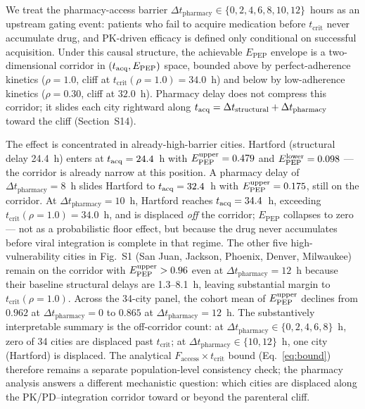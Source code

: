 \documentclass[10pt,letterpaper]{article}
\theoremstyle{definition}
\theoremstyle{remark}
\newcommand{\Epep}{E_{\text{PEP}}}
\newcommand{\Faccess}{F_{\text{access}}}
\newcommand{\tcrit}{t_{\text{crit}}}
\begin{document}
We treat the pharmacy-access barrier $\Delta t_{\text{pharmacy}} \in \{0, 2, 4, 6, 8, 10, 12\}$~hours as an upstream gating event: patients who fail to acquire medication before $\tcrit$ never accumulate drug, and PK-driven efficacy is defined only conditional on successful acquisition. Under this causal structure, the achievable $\Epep$ envelope is a two-dimensional corridor in $(t_{\rm acq}, \Epep)$ space, bounded above by perfect-adherence kinetics ($\rho = 1.0$, cliff at $\tcrit(\rho{=}1.0) = 34.0$~h) and below by low-adherence kinetics ($\rho = 0.30$, cliff at $32.0$~h). Pharmacy delay does not compress this corridor; it slides each city rightward along $t_{\rm acq} = \Delta t_{\text{structural}} + \Delta t_{\text{pharmacy}}$ toward the cliff (Section~S14).

The effect is concentrated in already-high-barrier cities. Hartford (structural delay 24.4~h) enters at $t_{\rm acq} = 24.4$~h with $\Epep^{\rm upper} = 0.479$ and $\Epep^{\rm lower} = 0.098$ --- the corridor is already narrow at this position. A pharmacy delay of $\Delta t_{\text{pharmacy}} = 8$~h slides Hartford to $t_{\rm acq} = 32.4$~h with $\Epep^{\rm upper} = 0.175$, still on the corridor. At $\Delta t_{\text{pharmacy}} = 10$~h, Hartford reaches $t_{\rm acq} = 34.4$~h, exceeding $\tcrit(\rho{=}1.0) = 34.0$~h, and is displaced \emph{off} the corridor; $\Epep$ collapses to zero --- not as a probabilistic floor effect, but because the drug never accumulates before viral integration is complete in that regime. The other five high-vulnerability cities in Fig.~S1 (San Juan, Jackson, Phoenix, Denver, Milwaukee) remain on the corridor with $\Epep^{\rm upper} > 0.96$ even at $\Delta t_{\text{pharmacy}} = 12$~h because their baseline structural delays are 1.3--8.1~h, leaving substantial margin to $\tcrit(\rho{=}1.0)$. Across the 34-city panel, the cohort mean of $\Epep^{\rm upper}$ declines from $0.962$ at $\Delta t_{\text{pharmacy}} = 0$ to $0.865$ at $\Delta t_{\text{pharmacy}} = 12$~h. The substantively interpretable summary is the off-corridor count: at $\Delta t_{\text{pharmacy}} \in \{0, 2, 4, 6, 8\}$~h, zero of 34 cities are displaced past $\tcrit$; at $\Delta t_{\text{pharmacy}} \in \{10, 12\}$~h, one city (Hartford) is displaced. The analytical $\Faccess \times \tcrit$ bound (Eq.~\ref{eq:bound}) therefore remains a separate population-level consistency check; the pharmacy analysis answers a different mechanistic question: which cities are displaced along the PK/PD--integration corridor toward or beyond the parenteral cliff.
\end{document}

